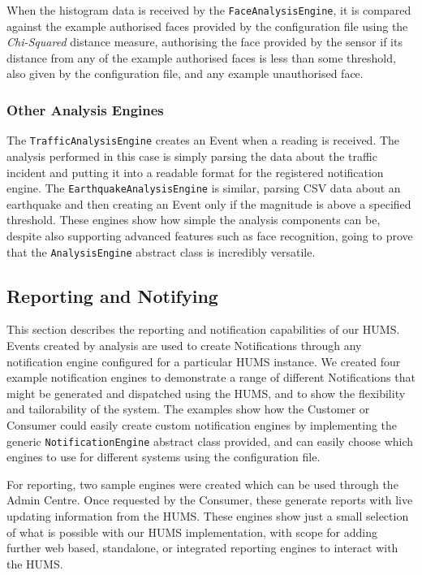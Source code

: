 \documentclass[10pt,a4paper]{article}
\begin{document}
When the histogram data is received by the \texttt{FaceAnalysisEngine}, it is compared against the example authorised faces provided by the configuration file using the \emph{Chi-Squared} distance measure, authorising the face provided by the sensor if its distance from any of the example authorised faces is less than some threshold, also given by the configuration file, and any example unauthorised face.

\subsubsection{Other Analysis Engines}
The \texttt{TrafficAnalysisEngine} creates an Event when a reading is received. The analysis performed in this case is simply parsing the data about the traffic incident and putting it into a readable format for the registered notification engine. The \texttt{EarthquakeAnalysisEngine} is similar, parsing CSV data about an earthquake and then creating an Event only if the magnitude is above a specified threshold. These engines show how simple the analysis components can be, despite also supporting advanced features such as face recognition, going to prove that the \texttt{AnalysisEngine} abstract class is incredibly versatile.

\subsection{Reporting and Notifying}
\label{sec:reporting}
This section describes the reporting and notification capabilities of our HUMS. Events created by analysis are used to create Notifications through any notification engine configured for a particular HUMS instance. We created four example notification engines to demonstrate a range of different Notifications that might be generated and dispatched using the HUMS, and to show the flexibility and tailorability of the system. The examples show how the Customer or Consumer could easily create custom notification engines by implementing the generic \texttt{NotificationEngine} abstract class provided, and can easily choose which engines to use for different systems using the configuration file.

For reporting, two sample engines were created which can be used through the Admin Centre. Once requested by the Consumer, these generate reports with live updating information from the HUMS. These engines show just a small selection of what is possible with our HUMS implementation, with scope for adding further web based, standalone, or integrated reporting engines to interact with the HUMS.
\end{document}
